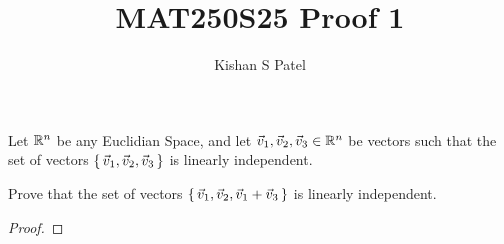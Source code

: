 \documentclass{exam}
\theoremstyle{plain}
\theoremstyle{definition}
\begin{document}
\title{MAT250S25 Proof 1}
\author{Kishan S Patel}
\maketitle



Let ${\mathbb R}^n$ be any Euclidian Space, and let $\vec v_1, \vec v_2, \vec v_3 \in {\mathbb R}^n$ be vectors such that the set
of vectors $\set{\vec v_1, \vec v_2, \vec v_3}$ is linearly independent.

Prove that the set of vectors $\set{\vec v_1, \vec v_2, \vec v_1 + \vec v_3}$ is linearly independent.

\begin{proof}

\end{proof}
\end{document}
